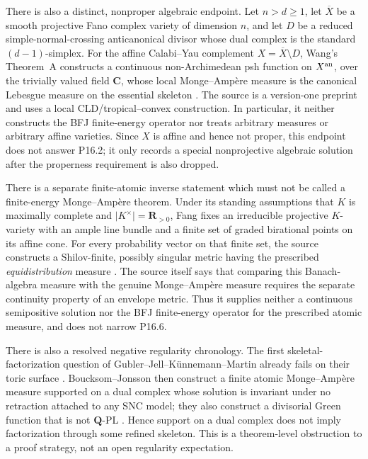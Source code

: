 There is also a distinct, nonproper algebraic endpoint.  Let \(n>d\geq1\),
let \(\overline X\) be a smooth projective Fano complex variety of dimension
\(n\), and let \(D\) be a reduced simple-normal-crossing anticanonical
divisor whose dual complex is the standard \((d-1)\)-simplex.  For the
affine Calabi--Yau complement \(X=\overline X\setminus D\), Wang's
Theorem~A constructs a continuous non-Archimedean psh function on
\(X^{\mathrm{an}}\), over the trivially valued field \(\mathbf C\), whose local
Monge--Amp\`ere measure is the canonical Lebesgue measure on the essential
skeleton \cite{Wang25NACalabiYau}.  The source is a version-one preprint and
uses a local CLD/tropical--convex construction.  In particular, it neither
constructs the BFJ finite-energy operator nor treats arbitrary measures or
arbitrary affine varieties.  Since \(X\) is affine and hence not proper,
this endpoint does not answer P16.2; it only records a special nonprojective
algebraic solution after the properness requirement is also dropped.

There is a separate finite-atomic inverse statement which must not be
called a finite-energy Monge--Amp\`ere theorem.  Under its standing
assumptions that \(K\) is maximally complete and
\(\lvert K^\times\rvert=\mathbf R_{>0}\), Fang fixes an irreducible
projective \(K\)-variety with an ample line bundle and a finite set of graded
birational points on its affine cone.  For every probability vector on that
finite set, the source constructs a Shilov-finite, possibly singular metric
having the prescribed \emph{equidistribution} measure
\cite[Proposition~4.8]{Fang25Shilov}.  The source itself says that comparing
this Banach-algebra measure with the genuine Monge--Amp\`ere measure requires
the separate continuity property of an envelope metric.  Thus it supplies
neither a continuous semipositive solution nor the BFJ finite-energy operator
for the prescribed atomic measure, and does not narrow P16.6.

There is also a resolved negative regularity chronology.  The first
skeletal-factorization question of Gubler--Jell--K\"unnemann--Martin already
fails on their toric surface \cite[Appendix~A]{GJKM19}.
Boucksom--Jonsson then construct a finite
atomic Monge--Amp\`ere measure supported on a dual complex whose solution is
invariant under no retraction attached to any SNC model; they also construct
a divisorial Green function that is not \(\mathbf Q\)-PL
\cite[Theorems~A and~B]{BJGreen24}.  Hence support on a dual complex does not
imply factorization through some refined skeleton.  This is a theorem-level
obstruction to a proof strategy, not an open regularity expectation.

